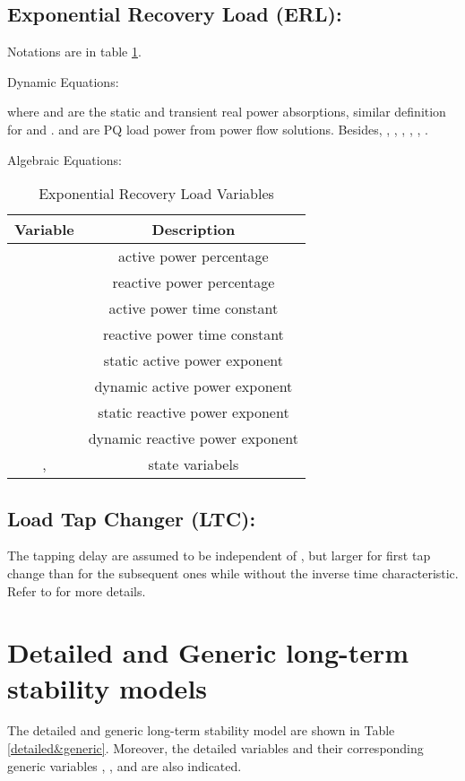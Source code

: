 \documentclass[journal]{IEEEtran}
\begin{document}
\subsection{Exponential Recovery Load (ERL):}
Notations are in table \ref{appedixtable6}.

Dynamic Equations:

where  and  are the static and transient real power absorptions, similar definition for  and .  and  are PQ load power from power flow solutions. Besides,
, , , , , .

Algebraic Equations:


\begin{table}[h]
\centering
\caption{Exponential Recovery Load Variables}{\label{appedixtable6}}
\begin{tabular}{|c|c|}
\hline
Variable&Description\\
\hline
&active power percentage\\
\hline
&reactive power percentage\\
\hline
&active power time constant\\
\hline
&reactive power time constant\\
\hline
&static active power exponent\\
\hline
&dynamic active power exponent\\
\hline
&static reactive power exponent\\
\hline
&dynamic reactive power exponent\\
\hline
,&state variabels\\
\hline
\end{tabular}
\end{table}
\subsection{Load Tap Changer (LTC):}

The tapping delay are assumed to be independent of , but larger for first tap change than for the subsequent ones while without the inverse time characteristic. Refer to \cite{Cutsem:book} for more details.

\section{Detailed and Generic long-term stability models}
The detailed and generic long-term stability model are shown in Table \ref{detailed&generic}. Moreover, the detailed variables and their corresponding generic variables , ,  and  are also indicated.
\end{document}
